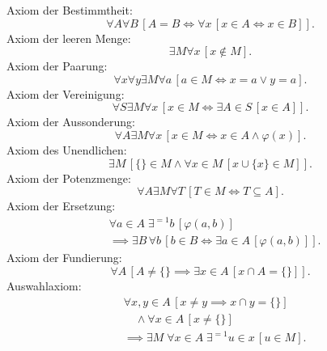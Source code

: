 Axiom der Bestimmtheit:
\begin{equation}
\forall A\forall B\,[A=B\iff\forall x\,[x\in A\Leftrightarrow x\in B]].
\end{equation}
Axiom der leeren Menge:
\begin{equation}
\exists M\forall x\,[x\notin M].
\end{equation}
Axiom der Paarung:
\begin{equation}
\forall x\forall y\exists M\forall a\,[a\in M\iff x=a\lor y=a].
\end{equation}
Axiom der Vereinigung:
\begin{equation}
\forall S\exists M\forall x\,[x\in M\iff\exists A{\in}S\,[x\in A]].
\end{equation}
Axiom der Aussonderung:
\begin{equation}
\forall A\exists M\forall x\,[x\in M\iff x\in A\land\varphi(x)].
\end{equation}
Axiom des Unendlichen:
\begin{equation}
\exists M\,[\{\}\in M\land\forall x{\in}M\,[x\cup\{x\}\in M]].
\end{equation}
Axiom der Potenzmenge:
\begin{equation}
\forall A\exists M\forall T\,[T\in M\iff T\subseteq A].
\end{equation}
Axiom der Ersetzung:
\begin{equation}
\begin{split}
&\forall a{\in}A\;\exists^{=1} b\,[\varphi(a,b)]\\
&\implies\exists B\,\forall b\,[b\in B\iff\exists a{\in}A\,[\varphi(a,b)]].
\end{split}
\end{equation}
Axiom der Fundierung:
\begin{equation}
\forall A\,[A\ne\{\}\implies\exists x{\in}A\,[x\cap A=\{\}]].
\end{equation}
Auswahlaxiom:
\begin{equation}
\begin{split}
&\forall x,y{\in}A\,[x\ne y\implies x\cap y=\{\}]\\
&\quad\land\forall x{\in}A\,[x\ne\{\}]\\
&\implies\exists M\;\forall x{\in}A\;\exists^{=1}u{\in}x\,[u\in M].
\end{split}
\end{equation}

\newpage
